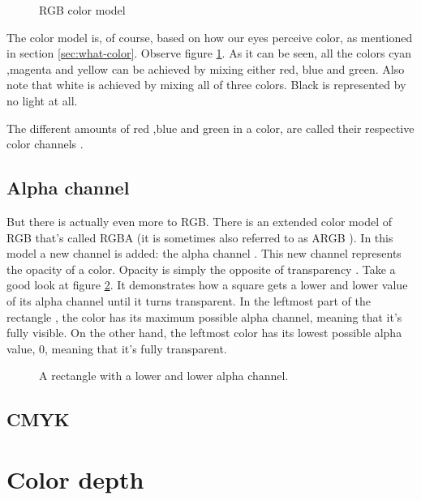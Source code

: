 \begin{refsection}
  \begin{figure}[h]
    \centering
    \caption{RGB color model}
    \label{fig:rgb}
  \end{figure}

  The color model is, of course, based on how our eyes perceive color,
  as mentioned in section \ref{sec:what-color}. Observe figure
  \ref{fig:rgb}. As it can be seen, all the colors cyan ,magenta and
  yellow can be achieved by mixing either red, blue and green. Also note
  that white is achieved by mixing all of three colors. Black is
  represented by no light at all.

  The different amounts of red ,blue and green in a color, are called
  their respective color channels .

  \subsection{Alpha channel}
  \label{sec:alpha_chan}

  But there is actually even more to RGB. There is an extended color
  model of RGB that's called RGBA (it is sometimes also
  referred to as ARGB ). In this model a new channel is
  added: the alpha channel . This new channel
  represents the opacity of a color. Opacity is simply the opposite of
  transparency \cite{porter84_compos_dig_img}. Take
  a good look at figure \ref{fig:alpha}. It demonstrates how a square
  gets a lower and lower value of its alpha channel until it turns
  transparent. In the leftmost part of the rectangle , the color has
  its maximum possible alpha channel, meaning that it's fully
  visible. On the other hand, the leftmost color has its lowest
  possible alpha value, $0$, meaning that it's fully transparent.

  \begin{figure}[h!]
    \centering
    \caption{A rectangle with a lower and lower alpha channel.}
    \label{fig:alpha}
  \end{figure}

  \subsection{CMYK}
  \label{sec:cmyk}


  \section{Color depth}
  \label{sec:color-depth}


\end{refsection}
